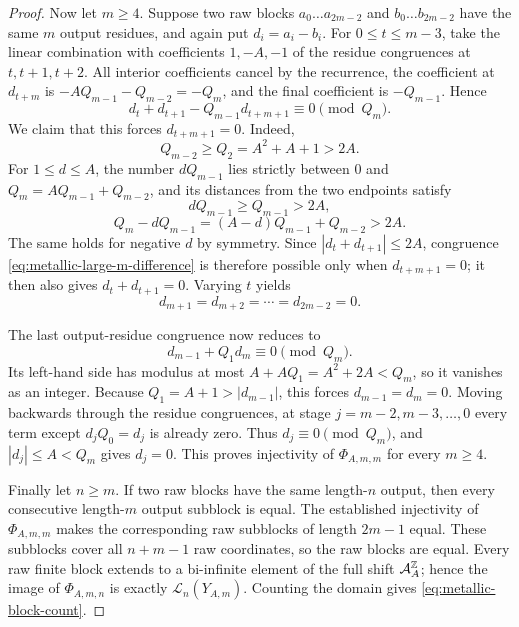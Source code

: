 \begin{proof}
Now let $m\ge4$.  Suppose two raw blocks
$a_0\ldots a_{2m-2}$ and $b_0\ldots b_{2m-2}$ have the same $m$ output
residues, and again put $d_i=a_i-b_i$.  For $0\le t\le m-3$, take the
linear combination with coefficients $1,-A,-1$ of the residue congruences
at $t,t+1,t+2$.  All interior coefficients cancel by the recurrence, the
coefficient at $d_{t+m}$ is $-AQ_{m-1}-Q_{m-2}=-Q_m$, and the final
coefficient is $-Q_{m-1}$.  Hence
\begin{equation}\label{eq:metallic-large-m-difference}
d_t+d_{t+1}-Q_{m-1}d_{t+m+1}\equiv0\pmod {Q_m}.
\end{equation}
We claim that this forces $d_{t+m+1}=0$.  Indeed,
\[
Q_{m-2}\ge Q_2=A^2+A+1>2A.
\]
For $1\le d\le A$, the number $dQ_{m-1}$ lies strictly between $0$ and
$Q_m=AQ_{m-1}+Q_{m-2}$, and its distances from the two endpoints satisfy
\[
dQ_{m-1}\ge Q_{m-1}>2A,
\]
\[
Q_m-dQ_{m-1}=(A-d)Q_{m-1}+Q_{m-2}>2A.
\]
The same holds for negative $d$ by symmetry.  Since
$|d_t+d_{t+1}|\le2A$, congruence
\eqref{eq:metallic-large-m-difference} is therefore possible only when
$d_{t+m+1}=0$; it then also gives $d_t+d_{t+1}=0$.  Varying $t$ yields
\[
d_{m+1}=d_{m+2}=\cdots=d_{2m-2}=0.
\]

The last output-residue congruence now reduces to
\[
d_{m-1}+Q_1d_m\equiv0\pmod {Q_m}.
\]
Its left-hand side has modulus at most $A+AQ_1=A^2+2A<Q_m$, so it vanishes
as an integer.  Because $Q_1=A+1>|d_{m-1}|$, this forces
$d_{m-1}=d_m=0$.  Moving backwards through the residue congruences, at
stage $j=m-2,m-3,\ldots,0$ every term except $d_jQ_0=d_j$ is already zero.
Thus $d_j\equiv0\pmod {Q_m}$, and $|d_j|\le A<Q_m$ gives $d_j=0$.  This
proves injectivity of $\Phi_{A,m,m}$ for every $m\ge4$.

Finally let $n\ge m$.  If two raw blocks have the same length-$n$ output,
then every consecutive length-$m$ output subblock is equal.  The established
injectivity of $\Phi_{A,m,m}$ makes the corresponding raw subblocks of length
$2m-1$ equal.  These subblocks cover all $n+m-1$ raw coordinates, so the raw
blocks are equal.  Every raw finite block extends to a bi-infinite element of
the full shift $\mathcal A_A^{\mathbb{Z}}$; hence the image of
$\Phi_{A,m,n}$ is exactly $\mathcal L_n(Y_{A,m})$.  Counting the domain gives
\eqref{eq:metallic-block-count}.
\end{proof}

